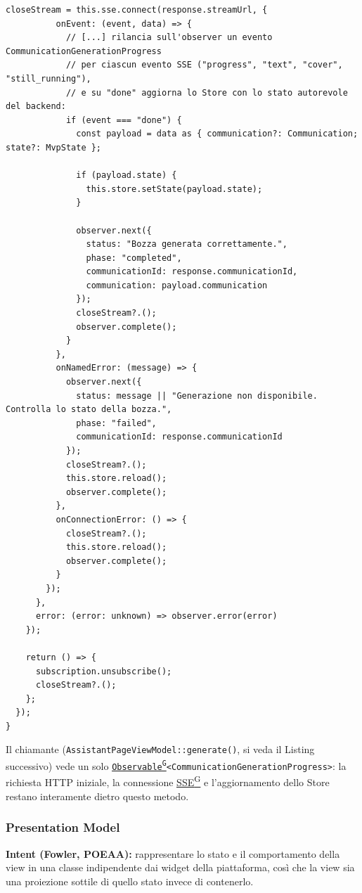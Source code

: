 \documentclass[a4paper,12pt]{article}
\providecommand{\glslink}[2]{\href{https://alittlebyte-19.github.io/Documentazione/glossario.html\#gls-#1}{\underline{#2}\textsuperscript{\scriptsize G}}}
\begin{document}
\begin{sloppypar}
\begin{lstlisting}[style=tslisting, caption={AssistantService -- Facade su client HTTP generato, SseClient e MvpStateStore dietro generate()}]
        closeStream = this.sse.connect(response.streamUrl, {
          onEvent: (event, data) => {
            // [...] rilancia sull'observer un evento CommunicationGenerationProgress
            // per ciascun evento SSE ("progress", "text", "cover", "still_running"),
            // e su "done" aggiorna lo Store con lo stato autorevole del backend:
            if (event === "done") {
              const payload = data as { communication?: Communication; state?: MvpState };

              if (payload.state) {
                this.store.setState(payload.state);
              }

              observer.next({
                status: "Bozza generata correttamente.",
                phase: "completed",
                communicationId: response.communicationId,
                communication: payload.communication
              });
              closeStream?.();
              observer.complete();
            }
          },
          onNamedError: (message) => {
            observer.next({
              status: message || "Generazione non disponibile. Controlla lo stato della bozza.",
              phase: "failed",
              communicationId: response.communicationId
            });
            closeStream?.();
            this.store.reload();
            observer.complete();
          },
          onConnectionError: () => {
            closeStream?.();
            this.store.reload();
            observer.complete();
          }
        });
      },
      error: (error: unknown) => observer.error(error)
    });

    return () => {
      subscription.unsubscribe();
      closeStream?.();
    };
  });
}
\end{lstlisting}

Il chiamante (\texttt{AssistantPageViewModel::generate()}, si veda il Listing successivo) vede un solo \texttt{\glslink{observable}{Observable}<CommunicationGenerationProgress>}: la richiesta HTTP iniziale, la connessione \glslink{sse-server-sent-events}{SSE} e l'aggiornamento dello Store restano interamente dietro questo metodo.

\subsubsection{Presentation Model}

\textbf{Intent (Fowler, POEAA):} rappresentare lo stato e il comportamento della view in una classe indipendente dai widget della piattaforma, così che la view sia una proiezione sottile di quello stato invece di contenerlo.


\end{sloppypar}
\end{document}
